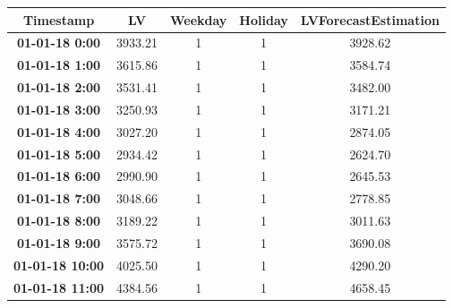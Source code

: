 \begin{table}[ht!]
\centering
\begin{tabular}{|c|c|c|c|c|}
\hline
\textbf{Timestamp}      & \textbf{LV} & \textbf{Weekday} & \textbf{Holiday} & \textbf{LVForecastEstimation} \\ \hline
\textbf{01-01-18 0:00}  & 3933.21     & 1                & 1                & 3928.62                       \\ \hline
\textbf{01-01-18 1:00}  & 3615.86     & 1                & 1                & 3584.74                       \\ \hline
\textbf{01-01-18 2:00}  & 3531.41     & 1                & 1                & 3482.00                       \\ \hline
\textbf{01-01-18 3:00}  & 3250.93     & 1                & 1                & 3171.21                       \\ \hline
\textbf{01-01-18 4:00}  & 3027.20     & 1                & 1                & 2874.05                       \\ \hline
\textbf{01-01-18 5:00}  & 2934.42     & 1                & 1                & 2624.70                       \\ \hline
\textbf{01-01-18 6:00}  & 2990.90     & 1                & 1                & 2645.53                       \\ \hline
\textbf{01-01-18 7:00}  & 3048.66     & 1                & 1                & 2778.85                       \\ \hline
\textbf{01-01-18 8:00}  & 3189.22     & 1                & 1                & 3011.63                       \\ \hline
\textbf{01-01-18 9:00}  & 3575.72     & 1                & 1                & 3690.08                       \\ \hline
\textbf{01-01-18 10:00} & 4025.50     & 1                & 1                & 4290.20                       \\ \hline
\textbf{01-01-18 11:00} & 4384.56     & 1                & 1                & 4658.45                       \\ \hline
\end{tabular}
\end{table}

